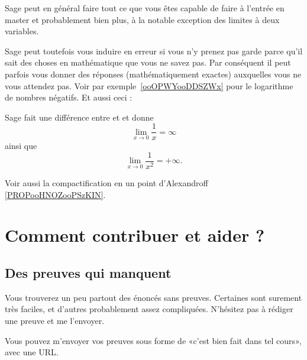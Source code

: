 Sage peut en général faire tout ce que vous êtes capable de faire à l'entrée en master et probablement bien plus, à la notable exception des limites à deux variables.

\begin{remark}
    Sage peut toutefois vous induire en erreur si vous n'y prenez pas garde parce qu'il sait des choses en mathématique que vous ne savez pas. Par conséquent il peut parfois vous donner des réponses (mathématiquement exactes) auxquelles vous ne vous attendez pas. Voir par exemple~\ref{ooOPWYooDDSZWx} pour le logarithme de nombres négatifs. Et aussi ceci :



Sage fait une différence entre  et  et donne
\begin{equation}
    \lim_{x\to 0} \frac{1}{ x }=\infty
\end{equation}
ainsi que
\begin{equation}
    \lim_{x\to 0} \frac{1}{ x^2 }=+\infty.
\end{equation}
\end{remark}

Voir aussi la compactification en un point d'Alexandroff \ref{PROPooHNOZooPSzKIN}.

\section{Comment contribuer et aider ?}
\label{SecooCKWWooBFgnea}

\subsection{Des preuves qui manquent}

Vous trouverez un peu partout des énoncés sans preuves. Certaines sont surement très faciles, et d'autres probablement assez compliquées. N'hésitez pas à rédiger une preuve et me l'envoyer.

Vous pouvez m'envoyer vos preuves sous forme de «c'est bien fait dans tel cours», avec une URL.

